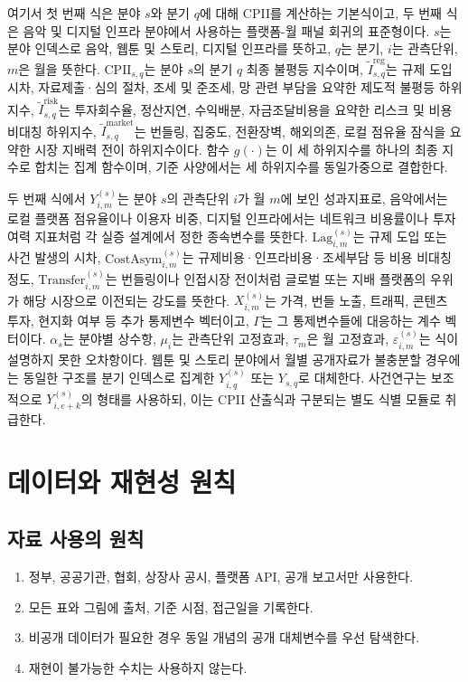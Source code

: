 \documentclass[11pt,a4paper]{report}
\begin{document}
여기서 첫 번째 식은 분야 $s$와 분기 $q$에 대해 CPII를 계산하는 기본식이고, 두 번째 식은 음악 및 디지털 인프라 분야에서 사용하는 플랫폼-월 패널 회귀의 표준형이다. $s$는 분야 인덱스로 음악, 웹툰 및 스토리, 디지털 인프라를 뜻하고, $q$는 분기, $i$는 관측단위, $m$은 월을 뜻한다. $\mathrm{CPII}_{s,q}$는 분야 $s$의 분기 $q$ 최종 불평등 지수이며, $\widetilde{I}^{\mathrm{reg}}_{s,q}$는 규제 도입 시차, 자료제출·심의 절차, 조세 및 준조세, 망 관련 부담을 요약한 제도적 불평등 하위지수, $\widetilde{I}^{\mathrm{risk}}_{s,q}$는 투자회수율, 정산지연, 수익배분, 자금조달비용을 요약한 리스크 및 비용 비대칭 하위지수, $\widetilde{I}^{\mathrm{market}}_{s,q}$는 번들링, 집중도, 전환장벽, 해외의존, 로컬 점유율 잠식을 요약한 시장 지배력 전이 하위지수이다. 함수 $g(\cdot)$는 이 세 하위지수를 하나의 최종 지수로 합치는 집계 함수이며, 기준 사양에서는 세 하위지수를 동일가중으로 결합한다.

두 번째 식에서 $Y_{i,m}^{(s)}$는 분야 $s$의 관측단위 $i$가 월 $m$에 보인 성과지표로, 음악에서는 로컬 플랫폼 점유율이나 이용자 비중, 디지털 인프라에서는 네트워크 비용률이나 투자 여력 지표처럼 각 실증 설계에서 정한 종속변수를 뜻한다. $\mathrm{Lag}_{i,m}^{(s)}$는 규제 도입 또는 사건 발생의 시차, $\mathrm{CostAsym}_{i,m}^{(s)}$는 규제비용·인프라비용·조세부담 등 비용 비대칭 정도, $\mathrm{Transfer}_{i,m}^{(s)}$는 번들링이나 인접시장 전이처럼 글로벌 또는 지배 플랫폼의 우위가 해당 시장으로 이전되는 강도를 뜻한다. $X_{i,m}^{(s)}$는 가격, 번들 노출, 트래픽, 콘텐츠 투자, 현지화 여부 등 추가 통제변수 벡터이고, $\Gamma$는 그 통제변수들에 대응하는 계수 벡터이다. $\alpha_s$는 분야별 상수항, $\mu_i$는 관측단위 고정효과, $\tau_m$은 월 고정효과, $\varepsilon_{i,m}^{(s)}$는 식이 설명하지 못한 오차항이다. 웹툰 및 스토리 분야에서 월별 공개자료가 불충분할 경우에는 동일한 구조를 분기 인덱스로 집계한 $Y_{i,q}^{(s)}$ 또는 $Y_{s,q}$로 대체한다. 사건연구는 보조적으로 $Y_{i,e+k}^{(s)}$의 형태를 사용하되, 이는 CPII 산출식과 구분되는 별도 식별 모듈로 취급한다.

\chapter{데이터와 재현성 원칙}
\section{자료 사용의 원칙}
\begin{enumerate}[label=\arabic*.]
  \item 정부, 공공기관, 협회, 상장사 공시, 플랫폼 API, 공개 보고서만 사용한다.
  \item 모든 표와 그림에 출처, 기준 시점, 접근일을 기록한다.
  \item 비공개 데이터가 필요한 경우 동일 개념의 공개 대체변수를 우선 탐색한다.
  \item 재현이 불가능한 수치는 사용하지 않는다.
\end{enumerate}
\end{document}
